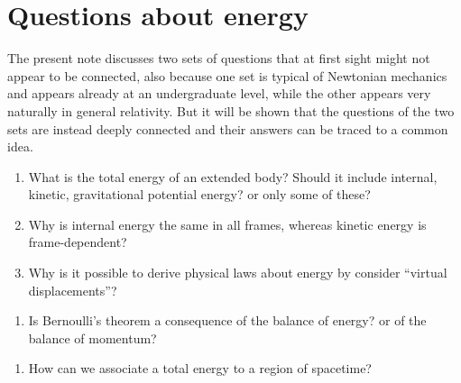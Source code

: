 \documentclass[a4paper,12pt,%
onecolumn,oneside,article,%
british%
]{memoir}
\renewcommand*{\|}[1][]{\nonscript\:#1\vert\nonscript\:\mathopen{}}
\newcommand*{\sect}{\S}%
\begin{document}



\section{Questions about energy}
\label{sec:intro}

The present note discusses two sets of questions that at first sight might not appear to be connected, also because one set is typical of Newtonian mechanics and appears already at an undergraduate level, while the other appears very naturally in general relativity. But it will be shown that the questions of the two sets are instead deeply connected and their answers can be traced to a common idea.

\begin{enumerate}[label=A\arabic*.,ref=A\arabic*]
\item\label{item:def_total_energy} What is the total energy of an extended body? Should it include internal, kinetic, gravitational potential energy? or only some of these?
\item\label{item:frame_indifference_energy} Why is internal energy the same in all frames, whereas kinetic energy is frame-dependent?
\item\label{item:virtual_work} Why is it possible to derive physical laws about energy by consider \enquote{virtual displacements}?
\end{enumerate}

\begin{enumerate}[label=A\arabic*.,ref=A\arabic*,start=4]
\item\label{item:bernoulli_theorem}Is Bernoulli's theorem a consequence of the balance of energy? or of the balance of momentum?
\end{enumerate}

\begin{enumerate}[label=B\arabic*.,ref=B\arabic*]
\item\label{item:integrate_energy} How can we associate a total energy to a region of spacetime?
\end{enumerate}
\end{document}
